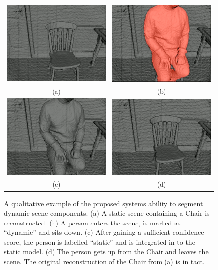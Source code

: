 \begin{figure}[!htbp]
~\label{fig:moseg_qualitative_chair}
  \centering
  \begin{tabular}{cc}
    \includegraphics[height=.25\linewidth]{figures/moseg/chair0.png} &
    \includegraphics[height=.25\linewidth]{figures/moseg/chair1.png} \\
    (a) & (b) \\
    \includegraphics[height=.25\linewidth]{figures/moseg/chair2.png} &
    \includegraphics[height=.25\linewidth]{figures/moseg/chair3.png} \\
    (c) & (d)
  \end{tabular}
  \caption[Motion Segmentation Qualitative Results II]
  {A qualitative example of the proposed systems ability to segment
    dynamic scene components.
    (a) A static scene containing a Chair is reconstructed.
    (b) A person enters the scene, is marked as ``dynamic'' and sits down.
    (c) After gaining a sufficient confidence score, the person is labelled
    ``static'' and is integrated in to the static model.
    (d) The person gets up from the Chair and leaves the scene. The original
    reconstruction of the Chair from (a) is in tact.}
\end{figure}

